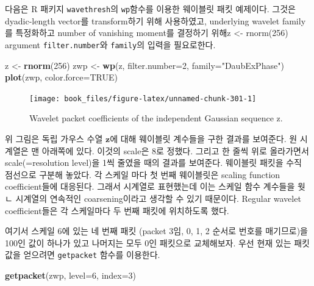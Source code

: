 \documentclass[b5paper,]{scrbook}
\makeatletter
\newenvironment{Shaded}{\begin{snugshade}}{\end{snugshade}}
\newcommand{\DataTypeTok}[1]{\textcolor[rgb]{0.13,0.29,0.53}{#1}}
\newcommand{\DecValTok}[1]{\textcolor[rgb]{0.00,0.00,0.81}{#1}}
\newcommand{\KeywordTok}[1]{\textcolor[rgb]{0.13,0.29,0.53}{\textbf{#1}}}
\newcommand{\NormalTok}[1]{#1}
\newcommand{\OtherTok}[1]{\textcolor[rgb]{0.56,0.35,0.01}{#1}}
\newcommand{\StringTok}[1]{\textcolor[rgb]{0.31,0.60,0.02}{#1}}
\theoremstyle{plain}
\theoremstyle{definition}
\numberwithin{equation}{section}
\newenvironment{kframe}{%
\medskip{}
\setlength{\fboxsep}{.8em}
 \def\at@end@of@kframe{}%
 \ifinner\ifhmode%
  \def\at@end@of@kframe{\end{minipage}}%
  \begin{minipage}{\columnwidth}%
 \fi\fi%
 \def\FrameCommand##1{\hskip\@totalleftmargin \hskip-\fboxsep
 \colorbox{shadecolor}{##1}\hskip-\fboxsep
     \hskip-\linewidth \hskip-\@totalleftmargin \hskip\columnwidth}%
 \MakeFramed {\advance\hsize-\width
   \@totalleftmargin\z@ \linewidth\hsize
   \@setminipage}}%
 {\par\unskip\endMakeFramed%
 \at@end@of@kframe}
\renewenvironment{Shaded}{\begin{kframe}}{\end{kframe}}
\makeatother
\begin{document}
다음은 R 패키지 \texttt{wavethresh}의 \texttt{wp}함수를 이용한 웨이블릿 패킷 예제이다. 그것은 dyadic-length vector를 transform하기 위해 사용하였고, underlying wavelet family를 특정화하고 number of vanishing moment를 결정하기 위해z \textless{}- rnorm(256) argument \texttt{filter.number}와 \texttt{family}의 입력을 필요로한다.

\begin{Shaded}
\begin{Highlighting}[]
\NormalTok{z <-}\StringTok{ }\KeywordTok{rnorm}\NormalTok{(}\DecValTok{256}\NormalTok{)}
\NormalTok{zwp <-}\StringTok{ }\KeywordTok{wp}\NormalTok{(z, }\DataTypeTok{filter.number=}\DecValTok{2}\NormalTok{, }\DataTypeTok{family=}\StringTok{"DaubExPhase"}\NormalTok{)}
\KeywordTok{plot}\NormalTok{(zwp, }\DataTypeTok{color.force=}\OtherTok{TRUE}\NormalTok{)}
\end{Highlighting}
\end{Shaded}

\begin{figure}

{\centering \texttt{[image: book\_files/figure-latex/unnamed-chunk-301-1]} 

}

\caption{Wavelet packet coefficients of the independent Gaussian sequence z.}\label{fig:unnamed-chunk-301}
\end{figure}

위 그림은 독립 가우스 수열 \(\mathbf{z}\)에 대해 웨이블릿 계수들을 구한 결과를 보여준다. 원 시계열은 맨 아래쪽에 있다. 이것의 scale은 8로 정했다. 그리고 한 줄씩 위로 올라가면서 scale(=resolution level)을 1씩 줄였을 때의 결과를 보여준다. 웨이블릿 패킷을 수직 점선으로 구분해 놓았다. 각 스케일 마다 첫 번째 웨이블릿은 scaling function coefficient들에 대응된다. 그래서 시계열로 표현했는데 이는 스케일 함수 계수들을 웟ㄴ 시계열의 연속적인 coarsening이라고 생각할 수 있기 때문이다. Regular wavelet coefficient들은 각 스케일마다 두 번째 패킷에 위치하도록 했다.

여기서 스케일 6에 있는 네 번째 패킷 (packet 3임, 0, 1, 2 순서로 번호를 매기므로)을 100인 값이 하나가 있고 나머지는 모두 0인 패킷으로 교체해보자. 우선 현재 있는 패킷 값을 얻으려면 \texttt{getpacket} 함수를 이용한다.

\begin{Shaded}
\begin{Highlighting}[]
\KeywordTok{getpacket}\NormalTok{(zwp, }\DataTypeTok{level=}\DecValTok{6}\NormalTok{, }\DataTypeTok{index=}\DecValTok{3}\NormalTok{)}
\end{Highlighting}
\end{Shaded}
\end{document}
